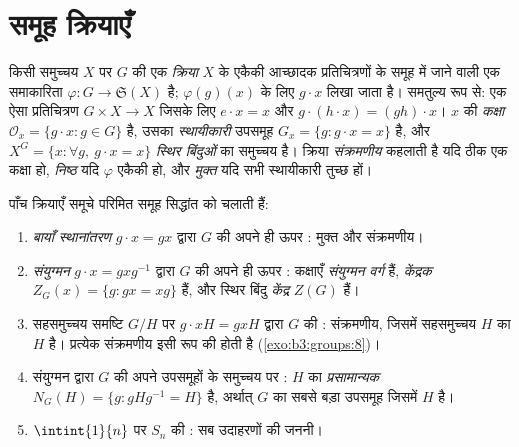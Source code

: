 \section{समूह क्रियाएँ}

\begin{definition}\label{def:b3:groups:action}
किसी समुच्चय $X$ पर $G$ की एक \emph{क्रिया} $X$ के एकैकी आच्छादक प्रतिचित्रणों के समूह में जाने
वाली एक समाकारिता $\varphi \colon G \to \mathfrak{S}(X)$ है; $\varphi(g)(x)$ के लिए $g \cdot x$ लिखा जाता है।
समतुल्य रूप से: एक ऐसा प्रतिचित्रण $G \times X \to X$ जिसके लिए $e \cdot x = x$ और
$g
\cdot (h \cdot x) = (gh) \cdot x$। $x$ की \emph{कक्षा} $\mathcal O_x = \{g \cdot x : g \in G\}$ है, उसका
\emph{स्थायीकारी} उपसमूह $G_x = \{g :
g\cdot x = x\}$ है, और $X^G = \{x : \forall g,\ g \cdot x = x\}$
\emph{स्थिर बिंदुओं} का समुच्चय है। क्रिया \emph{संक्रमणीय}
कहलाती है यदि ठीक एक कक्षा हो, \emph{निष्ठ} यदि $\varphi$ एकैकी हो,
और \emph{मुक्त} यदि सभी स्थायीकारी तुच्छ हों।
\end{definition}

\begin{example}\label{ex:b3:groups:actions}
पाँच क्रियाएँ समूचे परिमित समूह सिद्धांत को चलाती हैं:
\begin{enumerate}
  \item \emph{बायाँ स्थानांतरण} $g \cdot x = gx$ द्वारा $G$ की अपने ही
        ऊपर : मुक्त और संक्रमणीय।
  \item \emph{संयुग्मन} $g \cdot x = gxg^{-1}$ द्वारा $G$ की अपने ही ऊपर
        : कक्षाएँ \emph{संयुग्मन वर्ग} हैं,  \emph{केंद्रक}
         $Z_G(x) = \{g : gx = xg\}$ हैं, और स्थिर
        बिंदु \emph{केंद्र} $Z(G)$ हैं।
  \item सहसमुच्चय समष्टि $G/H$ पर $g \cdot xH = gxH$ द्वारा $G$ की :
        संक्रमणीय, जिसमें सहसमुच्चय $H$ का  $H$
        है। प्रत्येक संक्रमणीय  इसी रूप की होती है
        (\cref{exo:b3:groups:8})।
  \item संयुग्मन द्वारा $G$ की अपने उपसमूहों के समुच्चय पर
        : $H$ का  \emph{प्रसामान्यक}
         $N_G(H) =
        \{g : gHg^{-1} = H\}$ है, अर्थात् $G$ का सबसे बड़ा
        उपसमूह जिसमें $H$  है।
  \item $\intint{1}{n}$ पर $S_n$ की : सब उदाहरणों की जननी।
\end{enumerate}
\end{example}

